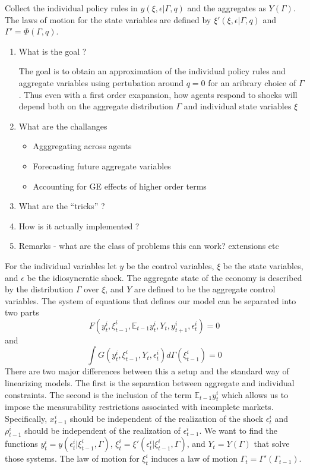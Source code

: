 \documentclass[thmsb,11pt]{article}
\newcommand{\EE}{\mathbb E}
\begin{document}
  Collect the individual policy rules in $y(\xi,\epsilon|\Gamma,q)$ and the aggregates as $Y(\Gamma)$. The laws of motion for the state variables are defined by $\xi'(\xi,\epsilon|\Gamma,q)$ and $\Gamma'=\Phi(\Gamma,q)$.
\begin{enumerate}


\item What is the goal ?

  The goal is to obtain an approximation of the individual policy rules and aggregate variables using pertubation around $q=0$ for an aribrary choice of $\Gamma$. Thus even with a first order exapansion, how agents respond to shocks will depend both on the aggregate distribution  $\Gamma$ and individual state variables $\xi$

\item What are the challanges

  \begin{itemize}
  \item Agggregating across agents 
  \item Forecasting future aggregate variables
  \item Accounting for GE effects of higher order terms
  \end{itemize}

\item What are the ``tricks'' ?

\item How is it actually implemented ?
\item Remarks - what are the class of problems this can work? extensions etc
\end{enumerate}
For the individual variables let $y$ be the control variables, $\xi$ be the  state variables, and  $\epsilon$ be the idiosyncratic shock.  The aggregate state of the economy is described by the distribution $\Gamma$ over $\xi$, and $Y$ are defined to be the aggregate control variables.  The system of equations that defines our model can be separated into two parts
\begin{equation}
	F(y^i_t,\xi^i_{t-1}, \EE_{t-1} y^i_t, Y_t, y^i_{t+1} ,\epsilon^i_t) = 0 
\end{equation}and
\begin{equation}
	\int G(y^i_t, \xi^i_{t-1},Y_t,\epsilon^i_t) d\Gamma(\xi^i_{t-1}) = 0
\end{equation}   There are two major differences between this a setup and the standard way of linearizing models.  The first is the separation between aggregate and individual constraints.   The second is the inclusion of the term  $\EE_{t-1} y^i_t$ which allows us to impose the measurability restrictions associated with incomplete markets.  Specifically, $x^i_{t-1}$ should be independent of the realization of the shock $\epsilon^i_t$ and $\rho^i_{t-1}$ should be independent of the realization of $\epsilon^i_{t-1}$.  We want to find the functions $y^i_t= y(\epsilon^i_t | \xi^i_{t-1},\Gamma)$, $\xi^i_t = \xi'(\epsilon^i_t | \xi^i_{t-1},\Gamma)$, and $Y_t = Y(\Gamma)$ that solve those systems.  The law of motion for $\xi^i_t$ induces a law of motion $\Gamma_t = \Gamma'(\Gamma_{t-1})$.
\end{document}
